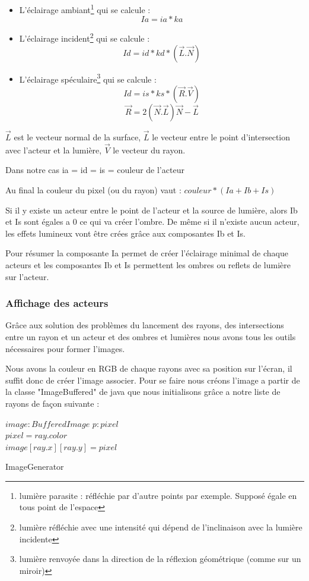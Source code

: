 \documentclass[12pt]{article}
\begin{document}
			\begin{itemize}
				\item L'éclairage ambiant\footnote{lumière parasite : réfléchie par d'autre points par exemple. Supposé égale en tous point de l'espace} qui se calcule : 
				\[Ia = ia*ka\]
				\item L'éclairage incident\footnote{lumière réfléchie avec une intensité qui dépend de l'inclinaison avec la lumière incidente} qui se calcule :
				\[Id = id*kd*(\vec{L}.\vec{N})\]
				\item L'éclairage spéculaire\footnote{lumière renvoyée dans la direction de la réflexion géométrique (comme sur un miroir)} qui se calcule :
				\[Id = is*ks*(\vec{R}.\vec{V})\]
				\[\vec{R} = 2(\vec{N}.\vec{L})\vec{N}-\vec{L}\]
			\end{itemize}
			$\vec{L}$ est le vecteur normal de la surface, $\vec{L}$ le vecteur entre le point d'intersection avec l'acteur et la lumière, $\vec{V}$ le vecteur du rayon.
			
			Dans notre cas ia = id = is = couleur de l'acteur
			
			Au final la couleur du pixel (ou du rayon) vaut : $couleur*(Ia + Ib + Is)$
			
			Si il y existe un acteur entre le point de l'acteur et la source de lumière, alors Ib et Is sont égales a 0 ce qui va créer l'ombre. De même si il n'existe aucun acteur, les effets lumineux vont être crées grâce aux composantes Ib et Is.
			
			Pour résumer la composante Ia permet de créer l'éclairage minimal de chaque acteurs et les composantes Ib et Is permettent les ombres ou reflets de lumière sur l'acteur.
			
			\subsubsection{Affichage des acteurs}
			Grâce aux solution des problèmes du lancement des rayons, des intersections entre un rayon et un acteur et des ombres et lumières nous avons tous les outils nécessaires pour former l'images.
			
			Nous avons la couleur en RGB de chaque rayons avec sa position sur l'écran, il suffit donc de créer l'image associer. Pour se faire nous créons l'image a partir de la classe "ImageBuffered" de java que nous initialisons grâce a notre liste de rayons de façon suivante :
			
			\begin{algorithm}[h]
			\DontPrintSemicolon
			$image : BufferedImage$\;
			$p : pixel$\\
			 {
  				$pixel = ray.color$\\
  				$image[ray.x][ray.y] = pixel$
			}
			\;
			\caption{{\sc ImageGenerator}}
			\label{algo:ImageGenerator}
			\end{algorithm}
			
\end{document}

